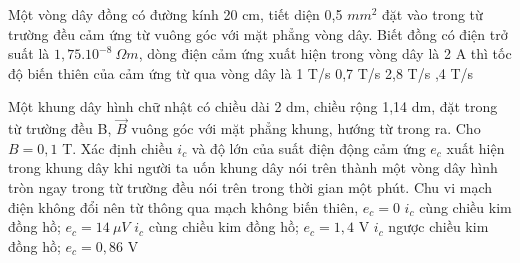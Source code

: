 \begin{vidu}%
Một vòng dây đồng có đường kính 20 cm, tiết diện 0,5 $mm^2$ đặt vào trong từ trường đều cảm ứng từ vuông góc với mặt phẳng vòng dây. Biết đồng có điện trở suất là $1,75.{10^{- 8}}\ \Omega m$, dòng điện cảm ứng xuất hiện trong vòng dây là 2 A thì tốc độ biến thiên của cảm ứng từ qua vòng dây là
\choice
{1 T/s}
{0,7 T/s}
{2,8 T/s}
{,4 T/s}
\end{vidu}
\begin{vidu}%
Một khung dây hình chữ nhật có chiều dài 2 dm, chiều rộng 1,14 dm, đặt trong từ trường đều B, $\vec{B}$ vuông góc với mặt phẳng khung, hướng từ trong ra. Cho $B = 0,1$ T. Xác định chiều $i_c$ và độ lớn của suất điện động cảm ứng $e_c$ xuất hiện trong khung dây khi người ta uốn khung dây nói trên thành một vòng dây hình tròn ngay trong từ trường đều nói trên trong thời gian một phút.
\choice
{Chu vi mạch điện không đổi nên từ thông qua mạch không biến thiên, $e_c = 0$}
{\True $i_c$ cùng chiều kim đồng hồ; $e_c = 14\ \mu V$}
{$i_c$ cùng chiều kim đồng hồ; $e_c = 1,4$ V}
{$i_c$ ngược chiều kim đồng hồ; $e_c = 0,86$ V}
\end{vidu}
